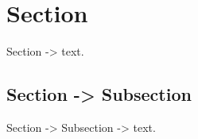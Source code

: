 \documentclass{article}%
\begin{document}
%
\normalsize%
\section{Section}%
\label{sec:Section}%
Section {-}> text.%
\subsection{Section {-}> Subsection}%
\label{subsec:Section{-}>Subsection}%
Section {-}> Subsection {-}> text.

%
\end{document}
